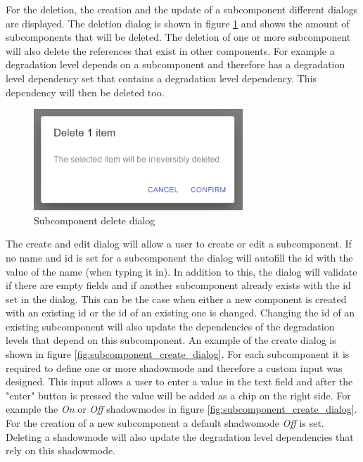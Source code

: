 For the deletion, the creation and the update of a subcomponent different dialogs are displayed. The deletion dialog is shown in figure \ref{fig:subcomponent_delete_dialog} and shows the amount of subcomponents that will be deleted. The deletion of one or more subcomponent will also delete the references that exist in other components. For example a degradation level depends on a subcomponent and therefore has a degradation level dependency set that contains a degradation level dependency. This dependency will then be deleted too.

\begin{figure}[ht]
    \centering
    \includegraphics[width=0.7\textwidth]{img/subcomponents_delete.png}
    \caption{Subcomponent delete dialog}
    \label{fig:subcomponent_delete_dialog}
\end{figure}

The create and edit dialog will allow a user to create or edit a subcomponent. If no name and id is set for a subcomponent the dialog will autofill the id with the value of the name (when typing it in). In addition to this, the dialog will validate if there are empty fields and if another subcomponent already exists with the id set in the dialog. This can be the case when either a new component is created with an existing id or the id of an existing one is changed. Changing the id of an existing subcomponent will also update the dependencies of the degradation levels that depend on this subcomponent. An example of the create dialog is shown in figure \ref{fig:subcomponent_create_dialog}. For each subcomponent it is required to define one or more shadowmode and therefore a custom input was designed. This input allows a user to enter a value in the text field and after the "enter" button is pressed the value will be added as a chip on the right side. For example the \textit{On} or \textit{Off} shadowmodes in figure \ref{fig:subcomponent_create_dialog}. For the creation of a new subcomponent a default shadwomode \textit{Off} is set. Deleting a shadowmode will also update the degradation level dependencies that rely on this shadowmode.


